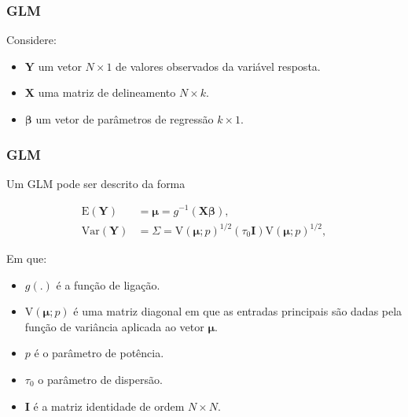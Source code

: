 \documentclass[10pt,
  aspectratio=169,
  serif,
  mathserif,
  professionalfont,
  compress,
  handout,
  ]{beamer}\usepackage[]{graphicx}\usepackage[]{color}
\begin{document}

\begin{frame}
  \frametitle{GLM}
  
  Considere:

\begin{itemize}
  \item $\boldsymbol{Y}$ um vetor $N \times 1$ de valores observados da variável resposta.
  
  \item $\boldsymbol{X}$ uma matriz de delineamento $N \times k$.
  
  \item $\boldsymbol{\beta}$ um vetor de parâmetros de regressão $k \times 1$. 
\end{itemize}

\end{frame}


\begin{frame}
  \frametitle{GLM}

Um GLM pode ser descrito da forma

\begin{equation}
      \begin{aligned}
        \mathrm{E}(\boldsymbol{Y}) &=
         \boldsymbol{\mu} =
            g^{-1}(\boldsymbol{X} \boldsymbol{\beta}),
            \\
        \mathrm{Var}(\boldsymbol{Y}) &=
          \Sigma =
          \mathrm{V}\left(\boldsymbol{\mu}; p\right)^{1/2}\left(\tau_0\boldsymbol{I}\right)\mathrm{V}\left(\boldsymbol{\mu}; p\right)^{1/2},
      \end{aligned}
\end{equation}

Em que:

  \begin{itemize}
    \itemsep 2ex
  
  \item $g(.)$ é a função de ligação. 
  
  \item $\mathrm{V}\left(\boldsymbol{\mu}; p\right)$ é uma matriz diagonal em que as entradas principais são dadas pela função de variância aplicada ao vetor $\boldsymbol{\mu}$. 
  
  \item $p$ é o parâmetro de potência. 
  
  \item $\tau_0$ o parâmetro de dispersão. 
  
  \item $\boldsymbol{I}$ é a matriz identidade de ordem $N\times N$.
  
  \end{itemize}
\end{frame}
\end{document}
